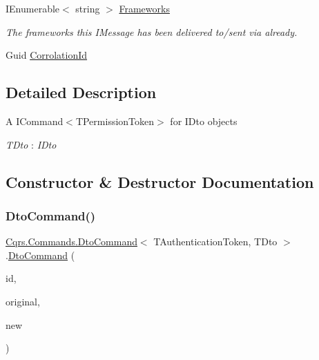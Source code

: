 \begin{DoxyCompactItemize}
I\+Enumerable$<$ string $>$ \hyperlink{classCqrs_1_1Commands_1_1DtoCommand_a2df20833afc756e5f7d553e4ed28406e_a2df20833afc756e5f7d553e4ed28406e}{Frameworks}
\begin{DoxyCompactList}\small\item\em The frameworks this I\+Message has been delivered to/sent via already. \end{DoxyCompactList}\item 
Guid \hyperlink{classCqrs_1_1Commands_1_1DtoCommand_a993ec84328a24072852d52fb8751114f_a993ec84328a24072852d52fb8751114f}{Corrolation\+Id}
\end{DoxyCompactItemize}


\subsection{Detailed Description}
A I\+Command$<$\+T\+Permission\+Token$>$ for I\+Dto objects 

\begin{Desc}
\item[Type Constraints]\begin{description}
\item[{\em T\+Dto} : {\em I\+Dto}]\end{description}
\end{Desc}


\subsection{Constructor \& Destructor Documentation}
\mbox{\label{classCqrs_1_1Commands_1_1DtoCommand_a705b7bdee6a242dd56821c60b4040b23_a705b7bdee6a242dd56821c60b4040b23}} 
\subsubsection{\texorpdfstring{Dto\+Command()}{DtoCommand()}}
{\footnotesize\ttfamily \hyperlink{classCqrs_1_1Commands_1_1DtoCommand}{Cqrs.\+Commands.\+Dto\+Command}$<$ T\+Authentication\+Token, T\+Dto $>$.\hyperlink{classCqrs_1_1Commands_1_1DtoCommand}{Dto\+Command} (\begin{DoxyParamCaption}\item[{Guid}]{id,  }\item[{T\+Dto}]{original,  }\item[{T\+Dto @}]{new }\end{DoxyParamCaption})}




